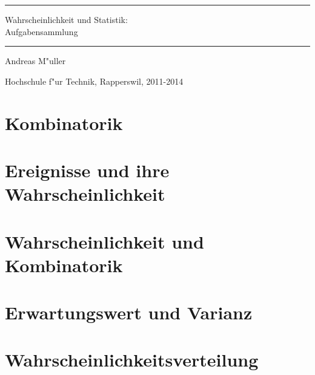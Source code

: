 \documentclass[a4paper,12pt]{book}
\begin{document}
\pagestyle{fancy}
\rhead{}
\frontmatter
\newcommand\HRule{\noindent\rule{\linewidth}{1.5pt}}
\begin{titlepage}
\HRule
\vspace*{2pt}
\begin{flushright}
{\Huge
Wahrscheinlichkeit und Statistik:\\
\bigskip
Aufgabensammlung}
\end{flushright}
\HRule
\begin{flushright}
\vspace{30pt}
\LARGE
Andreas M"uller
\end{flushright}
\begin{center}
Hochschule f"ur Technik, Rapperswil, 2011-2014
\end{center}
\end{titlepage}
\hypersetup{
        colorlinks=true,
        linktoc=all,
        linkcolor=blue
}
\tableofcontents
\newenvironment{beispiel}[1][Beispiel]{%
\begin{proof}[#1]%
\renewcommand{\qedsymbol}{$\bigcirc$}
}{\end{proof}}
\mainmatter


\chapter{Kombinatorik}

\chapter{Ereignisse und ihre Wahrscheinlichkeit}

\chapter{Wahrscheinlichkeit und Kombinatorik}

\chapter{Erwartungswert und Varianz}

\chapter{Wahrscheinlichkeitsverteilung}

\end{document}
